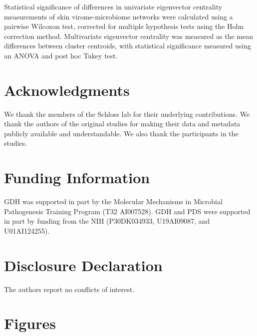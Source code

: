 \documentclass[12pt,]{article}
\begin{document}
Statistical significance of differences in univariate eigenvector
centrality measurements of skin virome-microbiome networks were
calculated using a pairwise Wilcoxon test, corrected for multiple
hypothesis tests using the Holm correction method. Multivariate
eigenvector centrality was measured as the mean differences between
cluster centroids, with statistical significance measured using an ANOVA
and post hoc Tukey test.

\section{Acknowledgments}\label{acknowledgments}

We thank the members of the Schloss lab for their underlying
contributions. We thank the authors of the original studies for making
their data and metadata publicly available and understandable. We also
thank the participants in the studies.

\section{Funding Information}\label{funding-information}

GDH was supported in part by the Molecular Mechanisms in Microbial
Pathogenesis Training Program (T32 AI007528). GDH and PDS were supported
in part by funding from the NIH (P30DK034933, U19AI09087, and
U01AI124255).

\section{Disclosure Declaration}\label{disclosure-declaration}

The authors report no conflicts of interest.

\newpage

\section{Figures}\label{figures}
\end{document}
